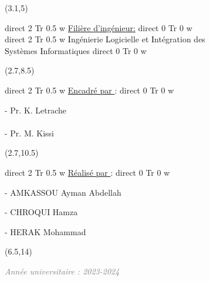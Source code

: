 \documentclass{report}
\newcommand{\textBF}[1]{%
    \pdfliteral direct {2 Tr 0.5 w} %
     #1%
    \pdfliteral direct {0 Tr 0 w}%
}
\begin{document}
\begin{textblock}{10}(3.1,5)
    \begin{center}
    \begin{Huge}
        \color{bluetext}
        \textBF{\underline{Filière \underline{d'ingénieur}:}} \\
        \vspace{5mm} 
        \textBF{\textcolor{black}{I}ngénierie \textcolor{black}{L}ogicielle et \textcolor{black}{I}ntégration des\\\textcolor{black}{S}ystèmes \textcolor{black}{I}nformatiques}
    \end{Huge}
    \end{center}
\end{textblock}

\begin{textblock}{10}(2.7,8.5)
    \begin{Huge}
        \textBF{\textcolor{bluetext}{\underline{Encadré par }:}}
        
        \vspace{0.7cm}
        {\Large{- Pr. K. Letrache \\  }}
        \\
        {\Large{\hspace*{0.55cm}- Pr. M. Kissi}}
    \end{Huge}
\end{textblock}

\begin{textblock}{10}(2.7,10.5)
    \begin{Huge}
        \textBF{\textcolor{bluetext}{\underline{Réalisé par }:}}
        
        \vspace{0.7cm}
        \Large{- AMKASSOU Ayman Abdellah}
        
        \vspace{0.4cm}
        \Large{- CHROQUI Hamza}
        
        \vspace{0.7cm}
        \Large{- HERAK Mohammad}
    \end{Huge}
\end{textblock}

\begin{textblock}{10}(6.5,14)
    \begin{Large}
        \emph{\textcolor{gray}{Année universitaire : 2023-2024 }}
    \end{Large}
\end{textblock}
\end{document}
